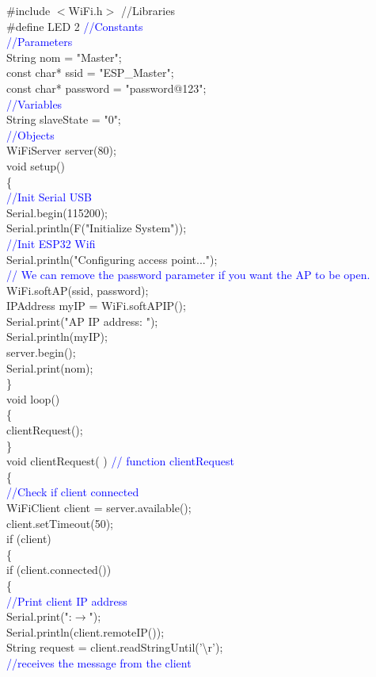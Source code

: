 \documentclass[12pt,a4paper]{article}
\begin{document}
\setlength{\parindent}{5eM}

\#include $<$WiFi.h$>$ //Libraries\\
\#define LED 2 \textcolor{blue}{//Constants}\\
\textcolor{blue}{//Parameters}\\
String nom = "Master";  \\
const char* ssid = "ESP\_Master";\\
const char* password = "password@123";\\
\textcolor{blue}{//Variables}\\
String slaveState = "0";\\
\textcolor{blue}{//Objects}\\
WiFiServer server(80); \\[15pt]

void setup()\\
 \{\\
 \textcolor{blue}{//Init Serial USB}\\
Serial.begin(115200);\\
Serial.println(F("Initialize System"));\\
 \textcolor{blue}{//Init ESP32 Wifi}\\
Serial.println("Configuring access point...");\\
  \textcolor{blue}{// We can remove the password parameter if you want the AP to be open.}\\
WiFi.softAP(ssid, password);\\
IPAddress myIP = WiFi.softAPIP();\\
Serial.print("AP IP address: ");\\
Serial.println(myIP);\\
server.begin();\\
Serial.print(nom);\\
\}\\[15pt]

void loop() \\
\{\\
 clientRequest();\\
\}\\[15pt]

void clientRequest( )  \textcolor{blue}{// function clientRequest}\\
\{\\ 
 \textcolor{blue}{//Check if client connected}\\
 WiFiClient client = server.available();\\
 client.setTimeout(50);\\
 if (client) \\
\{\\
   if (client.connected()) \\
\{\\
    \textcolor{blue}{ //Print client IP address}\\
     Serial.print(":$\rightarrow$");\\
     Serial.println(client.remoteIP());\\
     String request = client.readStringUntil('\textbackslash r');\\ \textcolor{blue}{//receives the message from the client}\\
    
\end{document}
